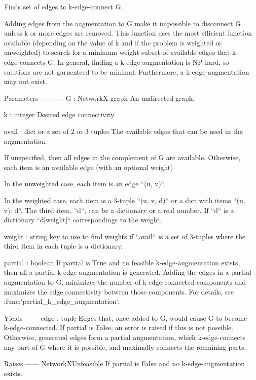 \begin{DoxyVerb}Finds set of edges to k-edge-connect G.

Adding edges from the augmentation to G make it impossible to disconnect G
unless k or more edges are removed. This function uses the most efficient
function available (depending on the value of k and if the problem is
weighted or unweighted) to search for a minimum weight subset of available
edges that k-edge-connects G. In general, finding a k-edge-augmentation is
NP-hard, so solutions are not garuenteed to be minimal. Furthermore, a
k-edge-augmentation may not exist.

Parameters
----------
G : NetworkX graph
   An undirected graph.

k : integer
    Desired edge connectivity

avail : dict or a set of 2 or 3 tuples
    The available edges that can be used in the augmentation.

    If unspecified, then all edges in the complement of G are available.
    Otherwise, each item is an available edge (with an optional weight).

    In the unweighted case, each item is an edge ``(u, v)``.

    In the weighted case, each item is a 3-tuple ``(u, v, d)`` or a dict
    with items ``(u, v): d``.  The third item, ``d``, can be a dictionary
    or a real number.  If ``d`` is a dictionary ``d[weight]``
    correspondings to the weight.

weight : string
    key to use to find weights if ``avail`` is a set of 3-tuples where the
    third item in each tuple is a dictionary.

partial : boolean
    If partial is True and no feasible k-edge-augmentation exists, then all
    a partial k-edge-augmentation is generated. Adding the edges in a
    partial augmentation to G, minimizes the number of k-edge-connected
    components and maximizes the edge connectivity between those
    components. For details, see :func:`partial_k_edge_augmentation`.

Yields
------
edge : tuple
    Edges that, once added to G, would cause G to become k-edge-connected.
    If partial is False, an error is raised if this is not possible.
    Otherwise, generated edges form a partial augmentation, which
    k-edge-connects any part of G where it is possible, and maximally
    connects the remaining parts.

Raises
------
NetworkXUnfeasible
    If partial is False and no k-edge-augmentation exists.


\end{DoxyVerb}
